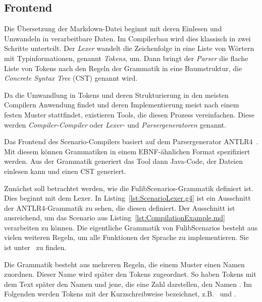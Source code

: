 \subsection{Frontend}\label{subsec:frontend-antlr4}

Die Übersetzung der Markdown-Datei beginnt mit deren Einlesen und Umwandeln in verarbeitbare Daten.
Im Compilerbau wird dies klassisch in zwei Schritte unterteilt.
Der \emph{Lexer} wandelt die Zeichenfolge in eine Liste von Wörtern mit Typinformationen, genannt \emph{Tokens}, um.
Dann bringt der \emph{Parser} die flache Liste von Tokens nach den Regeln der Grammatik in eine Baumstruktur, die \emph{Concrete Syntax Tree} (CST) genannt wird.

Da die Umwandlung in Tokens und deren Strukturierung in den meisten Compilern Anwendung findet und deren Implementierung meist nach einem festen Muster stattfindet, existieren Tools, die diesen Prozess vereinfachen.
Diese werden \emph{Compiler-Compiler} oder \emph{Lexer-} und \emph{Parsergeneratoren} genannt.

Das Frontend des Scenario-Compilers basiert auf dem Parsergenerator ANTLR4~\cite{antlr4-reference}.
Mit diesem können Grammatiken in einem EBNF-ähnlichen Format spezifiziert werden.
Aus der Grammatik generiert das Tool dann Java-Code, der Dateien einlesen kann und einen CST generiert.

Zunächst soll betrachtet werden, wie die FulibScenarios-Grammatik definiert ist.
Dies beginnt mit dem Lexer.
In Listing~\ref{lst:ScenarioLexer.g4} ist ein Ausschnitt der ANTLR4-Grammatik zu sehen, die diesen definiert.
Der Ausschnitt ist ausreichend, um das Scenario aus Listing~\ref{lst:CompilationExample.md} verarbeiten zu können.
Die eigentliche Grammatik von FulibScenarios besteht aus vielen weiteren Regeln, um alle Funktionen der Sprache zu implementieren.
Sie ist unter~\cite{lexer-grammar} zu finden.


Die Grammatik besteht aus mehreren Regeln, die einem Muster einen Namen zuordnen.
Dieser Name wird später den Tokens zugeordnet.
So haben Tokens mit dem Text  später den Namen  und jene, die eine Zahl darstellen, den Namen .
Im Folgenden werden Tokens mit der Kurzschreibweise  bezeichnet,
z.B.\  und .

